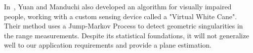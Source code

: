 In~\cite{yuan05dynamic}, Yuan and Manduchi also developed an algorithm for
visually impaired people, working with a custom sensing device called
a "Virtual White Cane". Their method uses a Jump-Markov Process to detect
geometric singularities in the range measurements. Despite its statistical
foundations, it will not generalize well to our application requirements and
provide a plane estimation.
